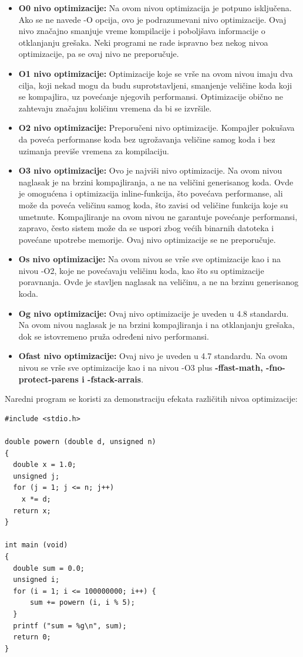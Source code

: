 \documentclass[a4paper]{article}
\begin{document}
\begin{itemize}
\item \textbf{O0 nivo optimizacije:} Na ovom nivou optimizacija je potpuno isključena. Ako se ne navede -O opcija, ovo je podrazumevani nivo optimizacije. Ovaj nivo značajno smanjuje vreme kompilacije i poboljšava informacije o otklanjanju grešaka. Neki programi ne rade ispravno bez nekog nivoa optimizacije, pa se ovaj nivo ne preporučuje.
\item \textbf{O1 nivo optimizacije:} Optimizacije koje se vrše na ovom nivou imaju dva cilja, koji nekad mogu da budu suprotstavljeni, smanjenje veličine koda koji se kompajlira, uz povećanje njegovih performansi. Optimizacije obično ne zahtevaju značajnu količinu vremena da bi se izvršile.
\item \textbf{O2 nivo optimizacije:} Preporučeni nivo optimizacije. Kompajler pokušava da poveća performanse koda bez ugrožavanja veličine samog koda i bez uzimanja previše vremena za kompilaciju.
\item \textbf{O3 nivo optimizacije:} Ovo je najviši nivo optimizacije. Na ovom nivou naglasak je na brzini kompajliranja, a ne na veličini generisanog koda. Ovde je omogućena i optimizacija inline-funkcija, što povećava performanse, ali može da poveća veličinu samog koda, što zavisi od veličine funkcija koje su umetnute. Kompajliranje na ovom nivou ne garantuje povećanje performansi, zapravo, često sistem može da se uspori zbog većih binarnih datoteka i povećane upotrebe memorije. Ovaj nivo optimizacije se ne preporučuje.
\item \textbf{Os nivo optimizacije:} Na ovom nivou se vrše sve optimizacije kao i na nivou -O2, koje ne povećavaju veličinu koda, kao što su optimizacije poravnanja. Ovde je stavljen naglasak na veličinu, a ne na brzinu generisanog koda.
\item \textbf{Og nivo optimizacije:} Ovaj nivo optimizacije je uveden u 4.8 standardu. Na ovom nivou naglasak je na brzini kompajliranja i na otklanjanju grešaka, dok se istovremeno pruža određeni nivo performansi.
\item \textbf{Ofast nivo optimizacije:} Ovaj nivo je uveden u 4.7 standardu. Na ovom nivou se vrše sve optimizacije kao i na nivou -O3 plus \textbf{-ffast-math, -fno-protect-parens i -fstack-arrais}. \cite{gccOptions}
\end{itemize}

Naredni program se koristi za demonstraciju efekata različitih nivoa optimizacije:
\newpage
\begin{lstlisting}
#include <stdio.h>

double powern (double d, unsigned n)
{
  double x = 1.0;
  unsigned j;
  for (j = 1; j <= n; j++)
    x *= d;
  return x;
}

int main (void)
{
  double sum = 0.0;
  unsigned i;
  for (i = 1; i <= 100000000; i++) {
      sum += powern (i, i % 5);
  }
  printf ("sum = %g\n", sum);
  return 0;
}
\end{lstlisting}
\end{document}
